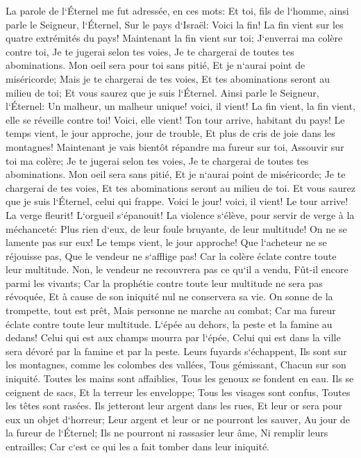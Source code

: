 \verse La parole de l`Éternel me fut adressée, en ces mots: 
\verse Et toi, fils de l`homme, ainsi parle le Seigneur, l`Éternel, Sur le pays d`Israël: Voici la fin! La fin vient sur les quatre extrémités du pays! 
\verse Maintenant la fin vient sur toi; J`enverrai ma colère contre toi, Je te jugerai selon tes voies, Je te chargerai de toutes tes abominations. 
\verse Mon oeil sera pour toi sans pitié, Et je n`aurai point de miséricorde; Mais je te chargerai de tes voies, Et tes abominations seront au milieu de toi; Et vous saurez que je suis l`Éternel. 
\verse Ainsi parle le Seigneur, l`Éternel: Un malheur, un malheur unique! voici, il vient! 
\verse La fin vient, la fin vient, elle se réveille contre toi! Voici, elle vient! 
\verse Ton tour arrive, habitant du pays! Le temps vient, le jour approche, jour de trouble, Et plus de cris de joie dans les montagnes! 
\verse Maintenant je vais bientôt répandre ma fureur sur toi, Assouvir sur toi ma colère; Je te jugerai selon tes voies, Je te chargerai de toutes tes abominations. 
\verse Mon oeil sera sans pitié, Et je n`aurai point de miséricorde; Je te chargerai de tes voies, Et tes abominations seront au milieu de toi. Et vous saurez que je suis l`Éternel, celui qui frappe. 
\verse Voici le jour! voici, il vient! Le tour arrive! La verge fleurit! L`orgueil s`épanouit! 
\verse La violence s`élève, pour servir de verge à la méchanceté: Plus rien d`eux, de leur foule bruyante, de leur multitude! On ne se lamente pas sur eux! 
\verse Le temps vient, le jour approche! Que l`acheteur ne se réjouisse pas, Que le vendeur ne s`afflige pas! Car la colère éclate contre toute leur multitude. 
\verse Non, le vendeur ne recouvrera pas ce qu`il a vendu, Fût-il encore parmi les vivants; Car la prophétie contre toute leur multitude ne sera pas révoquée, Et à cause de son iniquité nul ne conservera sa vie. 
\verse On sonne de la trompette, tout est prêt, Mais personne ne marche au combat; Car ma fureur éclate contre toute leur multitude. 
\verse L`épée au dehors, la peste et la famine au dedans! Celui qui est aux champs mourra par l`épée, Celui qui est dans la ville sera dévoré par la famine et par la peste. 
\verse Leurs fuyards s`échappent, Ils sont sur les montagnes, comme les colombes des vallées, Tous gémissant, Chacun sur son iniquité. 
\verse Toutes les mains sont affaiblies, Tous les genoux se fondent en eau. 
\verse Ils se ceignent de sacs, Et la terreur les enveloppe; Tous les visages sont confus, Toutes les têtes sont rasées. 
\verse Ils jetteront leur argent dans les rues, Et leur or sera pour eux un objet d`horreur; Leur argent et leur or ne pourront les sauver, Au jour de la fureur de l`Éternel; Ils ne pourront ni rassasier leur âme, Ni remplir leurs entrailles; Car c`est ce qui les a fait tomber dans leur iniquité. 
